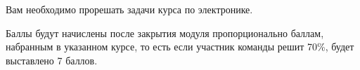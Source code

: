 
Вам необходимо прорешать задачи курса по электронике.

\markSection

Баллы будут начислены после закрытия модуля пропорционально баллам, набранным в указанном курсе, то есть если участник команды решит 70\%, будет выставлено 7 баллов. 
